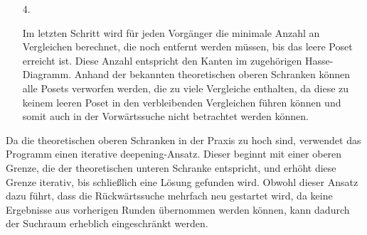 \documentclass[10pt,journal,compsoc]{IEEEtran}
\newtheorem{lemma}{Lemma}
\begin{document}
\begin{itemize}
  \item[4.]

    Im letzten Schritt wird für jeden Vorgänger die minimale Anzahl an Vergleichen berechnet, die noch entfernt werden müssen, bis das leere Poset erreicht ist.
    Diese Anzahl entspricht den Kanten im zugehörigen Hasse-Diagramm.
    Anhand der bekannten theoretischen oberen Schranken können alle Posets verworfen werden, die zu viele Vergleiche enthalten, da diese zu keinem leeren Poset in den verbleibenden Vergleichen führen können und somit auch in der Vorwärtssuche nicht betrachtet werden können.
\end{itemize}


Da die theoretischen oberen Schranken in der Praxis zu hoch sind, verwendet das Programm einen iterative deepening-Ansatz.
Dieser beginnt mit einer oberen Grenze, die der theoretischen unteren Schranke entspricht, und erhöht diese Grenze iterativ, bis schließlich eine Lösung gefunden wird.
Obwohl dieser Ansatz dazu führt, dass die Rückwärtssuche mehrfach neu gestartet wird, da keine Ergebnisse aus vorherigen Runden übernommen werden können, kann dadurch der Suchraum erheblich eingeschränkt werden.
\end{document}
